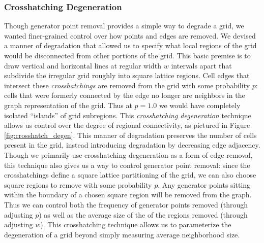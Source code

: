\documentclass[a4paper,11pt]{article}
\begin{document}
\subsubsection{Crosshatching Degeneration}
\label{subsec:ch_degen}
Though generator point removal provides a simple way to degrade a grid, we wanted finer-grained control over how points and edges are removed. We devised a manner of degradation that allowed us to specify what local regions of the grid would be disconnected from other portions of the grid. This basic premise is to draw vertical and horizontal lines at regular width $w$ intervals apart that subdivide the irregular grid roughly into square lattice regions. Cell edges that intersect these \textit{crosshatchings} are removed from the grid with some probability $p$: cells that were formerly connected by the edge no longer are neighbors in the graph representation of the grid. Thus at $p=1.0$ we would have completely isolated ``islands'' of grid subregions. This \textit{crosshatching degeneration} technique allows us control over the degree of regional connectivity, as pictured in Figure \ref{fig:crosshatch_degen}. This manner of degradation preserves the number of cells present in the grid, instead introducing degradation by decreasing edge adjacency. Though we primarily use crosshatching degeneration as a form of edge removal, this technique also gives us a way to control generator point removal: since the crosshatchings define a square lattice partitioning of the grid, we can also choose square regions to remove with some probability $p$. Any generator points sitting within the boundary of a chosen square region will be removed from the graph. Thus we can control both the frequency of generator points removed (through adjusting $p$) as well as the average size of the of the regions removed (through adjusting $w$). This crosshatching technique allows us to parameterize the degeneration of a grid beyond simply measuring average neighborhood size.
\end{document}
